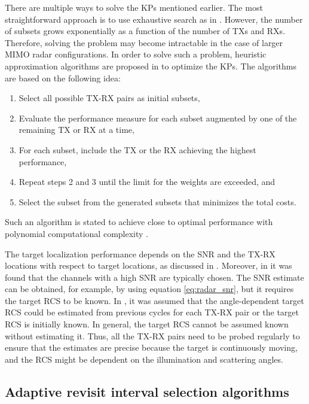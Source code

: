 \documentclass[english, 12pt, a4paper, elec, utf8, a-1b, online]{aaltothesis}
\numberwithin{equation}{section}
\begin{document}
There are multiple ways to solve the KPs mentioned earlier.
The most straightforward approach is to use exhaustive search as in \cite{Sun2014}.
However, the number of subsets grows exponentially as a function of the number of TXs and RXs.
Therefore, solving the problem may become intractable in the case of larger MIMO radar configurations.
In order to solve such a problem, heuristic approximation algorithms are proposed in \cite{Godrich2011a, Godrich2011} to optimize the KPs.
The algorithms are based on the following idea:
\begin{enumerate}
    \item Select all possible TX-RX pairs as initial subsets,
    \item Evaluate the performance measure for each subset augmented by one of the remaining TX or RX at a time, 
    \item For each subset, include the TX or the RX achieving the highest performance,
    \item Repeat steps 2 and 3 until the limit for the weights are exceeded, and
    \item Select the subset from the generated subsets that minimizes the total costs. 
\end{enumerate}
Such an algorithm is stated to achieve close to optimal performance with polynomial computational complexity \cite{Godrich2011a, Godrich2011}.

The target localization performance depends on the SNR and the TX-RX locations with respect to target locations, as discussed in \cite{Sun2014}.
Moreover, in \cite{Sun2014} it was found that the channels with a high SNR are typically chosen.
The SNR estimate can be obtained, for example, by using equation \eqref{eq:radar_snr}, but it requires the target RCS to be known.
In \cite{Godrich2011a, Godrich2011, Sun2014}, it was assumed that the angle-dependent target RCS could be estimated from previous cycles for each TX-RX pair or the target RCS is initially known.
In general, the target RCS cannot be assumed known without estimating it. 
Thus, all the TX-RX pairs need to be probed regularly to ensure that the estimates are precise because the target is continuously moving, and the RCS might be dependent on the illumination and scattering angles.


\subsection{Adaptive revisit interval selection algorithms} \label{sec:tbm_ri}
\end{document}
